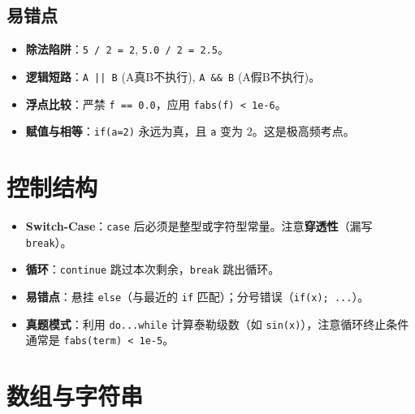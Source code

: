 \documentclass[a4paper,12pt]{article}
\begin{document}
\subsection{易错点}
\begin{itemize}
    \item \textbf{除法陷阱}：\texttt{5 / 2 = 2}, \texttt{5.0 / 2 = 2.5}。
    \item \textbf{逻辑短路}：\texttt{A || B} (A真B不执行), \texttt{A \&\& B} (A假B不执行)。
    \item \textbf{浮点比较}：严禁 \texttt{f == 0.0}，应用 \texttt{fabs(f) < 1e-6}。
    \item \textbf{赋值与相等}：\texttt{if(a=2)} 永远为真，且 \texttt{a} 变为 2。这是极高频考点。
\end{itemize}

\section{控制结构}

\begin{itemize}
    \item \textbf{Switch-Case}：\texttt{case} 后必须是整型或字符型常量。注意\textbf{穿透性}（漏写 \texttt{break}）。
    \item \textbf{循环}：\texttt{continue} 跳过本次剩余，\texttt{break} 跳出循环。
    \item \textbf{易错点}：悬挂 \texttt{else}（与最近的 \texttt{if} 匹配）；分号错误（\texttt{if(x); ...}）。
    \item \textbf{真题模式}：利用 \texttt{do...while} 计算泰勒级数（如 \texttt{sin(x)}），注意循环终止条件通常是 \texttt{fabs(term) < 1e-5}。
\end{itemize}

\section{数组与字符串}
\end{document}
